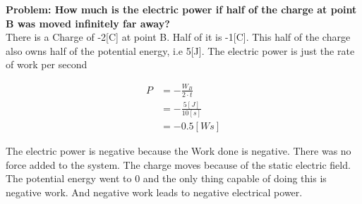 \documentclass[paper=a4, fontsize=11pt]{scrartcl} %
\numberwithin{equation}{section} %
\numberwithin{figure}{section} %
\numberwithin{table}{section} %
\begin{document}
\textbf{Problem: How much is the electric power if half of the charge at point B was 
moved infinitely far away?} \\

There is a Charge of -2[C] at point B. Half of it is -1[C]. This half of the charge also owns
half of the potential energy, i.e 5[J]. The electric power is just the rate of work per second

\begin{align} \label{eq:8}
P &= -\frac{W_B}{2 \cdot t} \\
  &= -\frac{5[J]}{10[s]} \\
  &= -0.5 [Ws]
\end{align}

The electric power is negative because the Work done is negative. There was no force added to the
system. The charge moves because of the static electric field. The potential energy went to 0 and
the only thing capable of doing this is negative work. And negative work leads to negative electrical
power.
\end{document}
